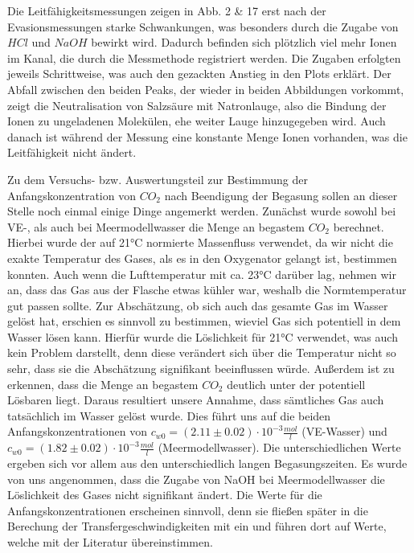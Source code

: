 \documentclass[12pt]{article}
\begin{document}
Die Leitfähigkeitsmessungen zeigen in Abb. 2 \& 17 erst nach der Evasionsmessungen starke Schwankungen, was besonders durch die Zugabe von $HCl$ und $NaOH$ bewirkt wird. Dadurch befinden sich plötzlich viel mehr Ionen im Kanal, die durch die Messmethode registriert werden. Die Zugaben erfolgten jeweils Schrittweise, was auch den gezackten Anstieg in den Plots erklärt.
Der Abfall zwischen den beiden Peaks, der wieder in beiden Abbildungen vorkommt, zeigt die Neutralisation von Salzsäure mit Natronlauge, also die Bindung der Ionen zu ungeladenen Molekülen, ehe weiter Lauge hinzugegeben wird. Auch danach ist während der Messung eine konstante Menge Ionen vorhanden, was die Leitfähigkeit nicht ändert.

Zu dem Versuchs- bzw. Auswertungsteil zur Bestimmung der Anfangskonzentration von $CO_2$ nach Beendigung der Begasung sollen an dieser Stelle noch einmal einige Dinge angemerkt werden. Zunächst wurde sowohl bei VE-, als auch bei Meermodellwasser die Menge an begastem $CO_2$ berechnet. Hierbei wurde der auf 21°C normierte Massenfluss verwendet, da wir nicht die exakte Temperatur des Gases, als es in den Oxygenator gelangt ist, bestimmen konnten. Auch wenn die Lufttemperatur mit ca. 23°C darüber lag, nehmen wir an, dass das Gas aus der Flasche etwas kühler war, weshalb die Normtemperatur gut passen sollte. Zur Abschätzung, ob sich auch das gesamte Gas im Wasser gelöst hat, erschien es sinnvoll zu bestimmen, wieviel Gas sich potentiell in dem Wasser lösen kann. Hierfür wurde die Löslichkeit für 21°C verwendet, was auch kein Problem darstellt, denn diese verändert sich über die Temperatur nicht so sehr, dass sie die Abschätzung signifikant beeinflussen würde. Außerdem ist zu erkennen, dass die Menge an begastem $CO_2$ deutlich unter der potentiell Lösbaren liegt. Daraus resultiert unsere Annahme, dass sämtliches Gas auch tatsächlich im Wasser gelöst wurde. Dies führt uns auf die beiden Anfangskonzentrationen von $c_{w0} = (2.11 \pm 0.02)\cdot 10^{-3} \frac{mol}{l}$ (VE-Wasser) und $c_{w0} = (1.82 \pm 0.02)\cdot 10^{-3} \frac{mol}{l}$ (Meermodellwasser). Die unterschiedlichen Werte ergeben sich vor allem aus den unterschiedlich langen Begasungszeiten. Es wurde von uns angenommen, dass die Zugabe von NaOH bei Meermodellwasser die Löslichkeit des Gases nicht signifikant ändert. Die Werte für die Anfangskonzentrationen erscheinen sinnvoll, denn sie fließen später in die Berechung der Transfergeschwindigkeiten mit ein und führen dort auf Werte, welche mit der Literatur übereinstimmen.
\end{document}
